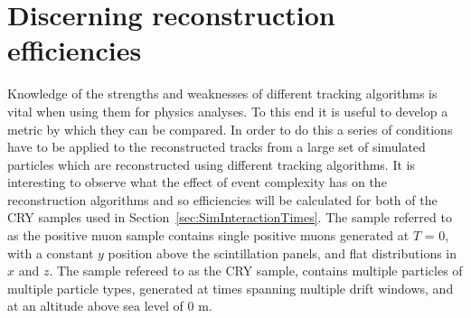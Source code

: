 \section{Discerning reconstruction efficiencies} \label{sec:SimRecoEffic} %
Knowledge of the strengths and weaknesses of different tracking algorithms is vital when using them for physics analyses. To this end it is useful to develop a metric by which they can be compared. In order to do this a series of conditions have to be applied to the reconstructed tracks from a large set of simulated particles which are reconstructed using different tracking algorithms. It is interesting to observe what the effect of event complexity has on the reconstruction algorithms and so efficiencies will be calculated for both of the CRY samples used in Section~\ref{sec:SimInteractionTimes}. The sample referred to as the positive muon sample contains single positive muons generated at $T$ = 0, with a constant $y$ position above the scintillation panels, and flat distributions in $x$ and $z$. The sample refereed to as the CRY sample, contains multiple particles of multiple particle types, generated at times spanning multiple drift windows, and at an altitude above sea level of 0 m. \\


